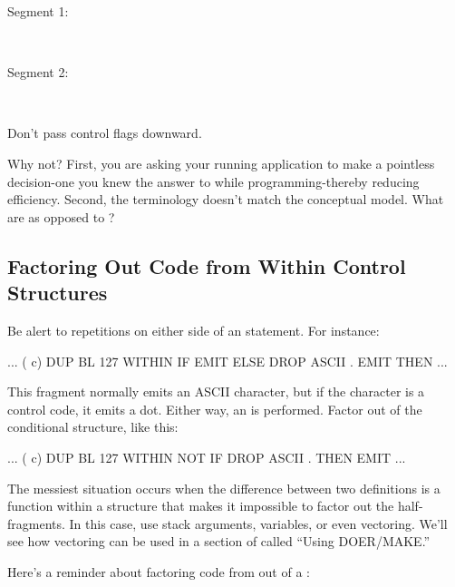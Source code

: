 \begin{description}
\item[Segment 1:]~~ ~~~~
\item[Segment 2:]~~ ~~~~
\end{description}

\begin{tip}
Don't pass control flags downward.
\end{tip}
Why not? First, you are asking your running application to make a
pointless decision-one you knew the answer to while
programming-thereby reducing efficiency. Second, the terminology
doesn't match the conceptual model. What are 
as opposed to ?

\subsection{Factoring Out Code from Within Control Structures}

Be alert to repetitions on either side of an 
statement. For instance:

\begin{Code}
... ( c)  DUP  BL 127 WITHIN
       IF  EMIT  ELSE
       DROP  ASCII . EMIT   THEN ...
\end{Code}
This fragment normally emits an ASCII character, but if the character
is a control code, it emits a dot. Either way, an  is
performed. Factor  out of the conditional structure, like
this:

\begin{Code}
... ( c)  DUP  BL 127 WITHIN NOT
       IF  DROP  ASCII .  THEN  EMIT  ...
\end{Code}
The messiest situation occurs when the difference between two
definitions is a function within a structure that makes it impossible
to factor out the half-fragments. In this case, use stack arguments,
variables, or even vectoring. We'll see how vectoring can be used in a
section of  called ``Using DOER/MAKE.''

Here's a reminder about factoring code from out of a :

